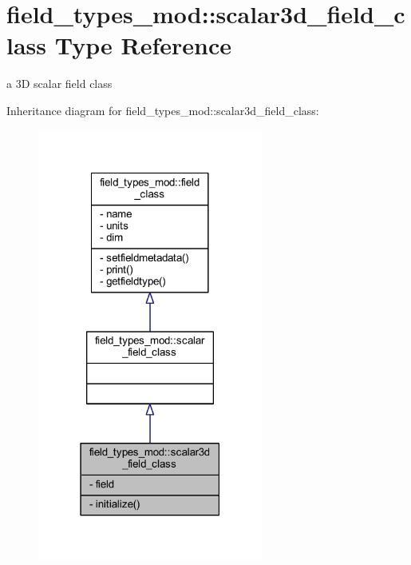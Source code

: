 \hypertarget{structfield__types__mod_1_1scalar3d__field__class}{}\section{field\+\_\+types\+\_\+mod\+:\+:scalar3d\+\_\+field\+\_\+class Type Reference}
\label{structfield__types__mod_1_1scalar3d__field__class}


a 3D scalar field class  




Inheritance diagram for field\+\_\+types\+\_\+mod\+:\+:scalar3d\+\_\+field\+\_\+class\+:
\nopagebreak
\begin{figure}[H]
\begin{center}
\leavevmode
\includegraphics[width=210pt]{structfield__types__mod_1_1scalar3d__field__class__inherit__graph}
\end{center}
\end{figure}


